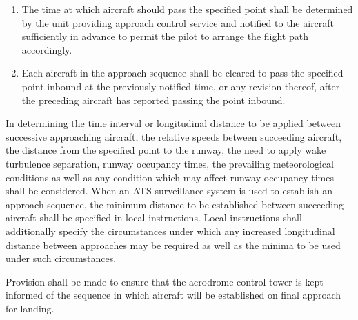 \begin{enumeratesc}
\begin{enumerate}[labelindent=0pt,itemsep=0.2cm]
\begin{enumerate}
            \item The time at which aircraft should pass the specified point shall be determined by the unit providing approach control service and notified to the aircraft sufficiently in advance to permit the pilot to arrange the flight path accordingly.
            \item Each aircraft in the approach sequence shall be cleared to pass the specified point inbound at the previously notified time, or any revision thereof, after the preceding aircraft has reported passing the point inbound.
        \end{enumerate}


        \noindent In determining the time interval or longitudinal distance to be applied between successive approaching aircraft, the relative speeds between succeeding aircraft, the distance from the specified point to the runway, the need to apply wake turbulence separation, runway occupancy times, the prevailing meteorological conditions as well as any condition which may affect runway occupancy times shall be considered. When an ATS surveillance system is used to establish an approach sequence, the minimum distance to be established between succeeding aircraft shall be specified in local instructions. Local instructions shall additionally specify the circumstances under which any increased longitudinal distance between approaches may be required as well as the minima to be used under such circumstances.


        \noindent Provision shall be made to ensure that the aerodrome control tower is kept informed of the sequence in which aircraft will be established on final approach for landing.
    \end{enumerate}
\end{enumeratesc}

